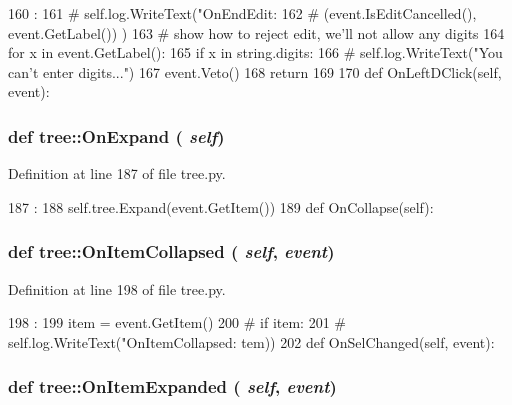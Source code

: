 \begin{DoxyCode}
160                               :
161 #        self.log.WriteText("OnEndEdit: %
162 #                           (event.IsEditCancelled(), event.GetLabel()) )
163         # show how to reject edit, we'll not allow any digits
164         for x in event.GetLabel():
165             if x in string.digits:
166 #                self.log.WriteText("You can't enter digits...\n")
167                 event.Veto()
168                 return
169 
170 
    def OnLeftDClick(self, event):
\end{DoxyCode}
\hypertarget{namespacetree_a5410148429c50c884b84f6e26bce48d7}{
\subsubsection[{OnExpand}]{\setlength{\rightskip}{0pt plus 5cm}def tree::OnExpand ( {\em self})}}
\label{namespacetree_a5410148429c50c884b84f6e26bce48d7}


Definition at line 187 of file tree.py.


\begin{DoxyCode}
187                       :
188         self.tree.Expand(event.GetItem())
189 
    def OnCollapse(self):
\end{DoxyCode}
\hypertarget{namespacetree_a76d600fd54383428463e3b1500f708e5}{
\subsubsection[{OnItemCollapsed}]{\setlength{\rightskip}{0pt plus 5cm}def tree::OnItemCollapsed ( {\em self}, \/   {\em event})}}
\label{namespacetree_a76d600fd54383428463e3b1500f708e5}


Definition at line 198 of file tree.py.


\begin{DoxyCode}
198                                     :
199         item = event.GetItem()
200 #        if item:
201 #            self.log.WriteText("OnItemCollapsed: %
      tem))
202 
    def OnSelChanged(self, event):
\end{DoxyCode}
\hypertarget{namespacetree_a7bf50c066f74a62b4763849454e10a2c}{
\subsubsection[{OnItemExpanded}]{\setlength{\rightskip}{0pt plus 5cm}def tree::OnItemExpanded ( {\em self}, \/   {\em event})}}
\label{namespacetree_a7bf50c066f74a62b4763849454e10a2c}


